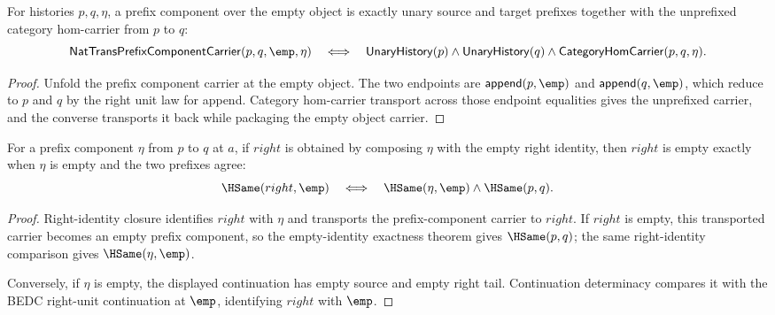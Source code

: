\begin{theorem}
\label{thm:nattrans-prefix-empty-object}
For histories $p,q,\eta$, a prefix component over the empty object is exactly
unary source and target prefixes together with the unprefixed category
hom-carrier from $p$ to $q$:
$$
\mathsf{NatTransPrefixComponentCarrier}(p,q,\emp,\eta)
\quad\Longleftrightarrow\quad
\mathsf{UnaryHistory}(p)\wedge\mathsf{UnaryHistory}(q)\wedge
\mathsf{CategoryHomCarrier}(p,q,\eta).
$$
\end{theorem}
\begin{proof}
Unfold the prefix component carrier at the empty object. The two endpoints are
$\mathsf{append}(p,\emp)$ and $\mathsf{append}(q,\emp)$, which reduce to $p$
and $q$ by the right unit law for append. Category hom-carrier transport across
those endpoint equalities gives the unprefixed carrier, and the converse
transports it back while packaging the empty object carrier.
\end{proof}

\begin{theorem}
\label{thm:nattrans-prefix-component-right-identity-empty-result}
For a prefix component $\eta$ from $p$ to $q$ at $a$, if $right$ is obtained
by composing $\eta$ with the empty right identity, then $right$ is empty
exactly when $\eta$ is empty and the two prefixes agree:
$$
\HSame(right,\emp)
\quad\Longleftrightarrow\quad
\HSame(\eta,\emp)\land \HSame(p,q).
$$
\end{theorem}
\begin{proof}
Right-identity closure identifies $right$ with $\eta$ and transports the
prefix-component carrier to $right$. If $right$ is empty, this transported
carrier becomes an empty prefix component, so the empty-identity exactness
theorem gives $\HSame(p,q)$; the same right-identity comparison gives
$\HSame(\eta,\emp)$.

Conversely, if $\eta$ is empty, the displayed continuation has empty source
and empty right tail. Continuation determinacy compares it with the BEDC
right-unit continuation at $\emp$, identifying $right$ with $\emp$.
\end{proof}

